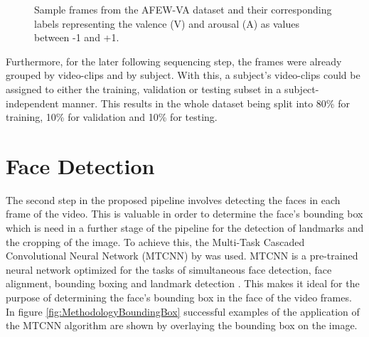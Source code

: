 \begin{figure}[ht]
  \hfill
  \caption{Sample frames from the AFEW-VA dataset \citep{Kossaifi:2017:AFEW-VADatabase} and their corresponding labels representing the valence (V) and arousal (A) as values between -1 and +1.}
  \label{fig:MethodologyPreprocess}
\end{figure}

Furthermore, for the later following sequencing step, the frames were already grouped by video-clips and by subject. With this, a subject's video-clips could be assigned to either the training, validation or testing subset in a subject-independent manner. This results in the whole dataset being split into 80\% for training, 10\% for validation and 10\% for testing.

\section{Face Detection} \label{sec:FaceDetection}
The second step in the proposed pipeline involves detecting the faces in each frame of the video. This is valuable in order to determine the face's bounding box which is need in a further stage of the pipeline for the detection of landmarks and the cropping of the image. To achieve this, the Multi-Task Cascaded Convolutional Neural Network (MTCNN) by \citet{Zhang:2016:MTCCN} was used.
\newline\newline
MTCNN is a pre-trained neural network optimized for the tasks of simultaneous face detection, face alignment, bounding boxing and landmark detection \citep{Brownlee:2019:VggFace2HowToFaceRec}. This makes it ideal for the purpose of determining the face's bounding box in the face of the video frames. In figure \ref{fig:MethodologyBoundingBox} successful examples of the application of the MTCNN algorithm are shown by overlaying the bounding box on the image.

